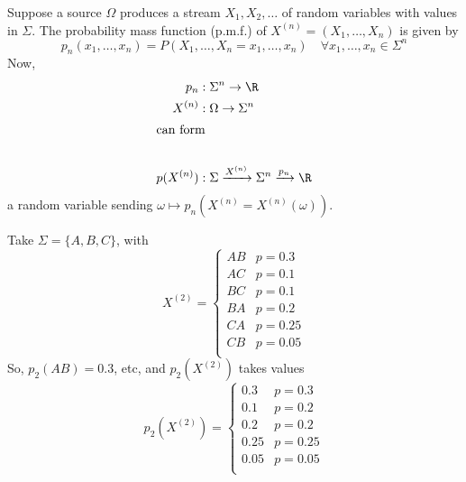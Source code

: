 \documentclass{article}
\begin{document}
Suppose a source $\Omega$ produces a stream $X_1, X_2, \dotsc$ of random variables with values in $\Sigma$.
The probability mass function (p.m.f.) of $X^{(n)} = (X_1, \dotsc, X_n)$ is given by
\begin{equation*}p_n(x_1, \dotsc, x_n) = P(X_1, \dotsc, X_n = x_1, \dotsc, x_n) \quad \forall x_1, \dotsc, x_n \in \Sigma^n\end{equation*}
Now,
\begin{align*}
    p_n &: \Sigma^n \to \R \\
    X^{(n)} &: \Omega \to \Sigma^n\\
    \shortintertext{can form} \\
    p(X^{(n)})&: \Sigma \xrightarrow{X^{(n)}} \Sigma^n \xrightarrow{p_n} \R
\end{align*}
a random variable sending $\omega \mapsto p_n(X^{(n)} = X^{(n)} (\omega))$.
\begin{eg}
    Take $\Sigma = \{A, B, C\}$, with
    \begin{equation*}
        X^{(2)} =
        \begin{cases}
            AB & p=0.3 \\
            AC & p=0.1 \\
            BC & p=0.1 \\
            BA & p=0.2 \\
            CA & p=0.25 \\
            CB & p=0.05 \\
        \end{cases}
    \end{equation*}
    So, $p_2(AB) = 0.3$, etc, and $p_2(X^{(2)})$ takes values
    \begin{equation*}
        p_2(X^{(2)}) =
        \begin{cases}
            0.3 & p=0.3 \\
            0.1 & p=0.2 \\
            0.2 & p=0.2 \\
            0.25 & p=0.25 \\
            0.05 & p=0.05 \\
        \end{cases}
    \end{equation*}
\end{eg}

\end{document}
